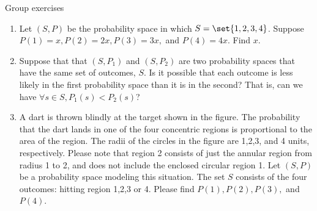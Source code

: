 \documentclass[10pt]{beamer}
\begin{document}
\begin{frame}{Group exercises}
\small 
\begin{minipage}{.83\textwidth}
\begin{enumerate}
	\item Let $(S,P)$ be the probability space in which $S=\set{1,2,3,4}$. Suppose $P(1) =x, P(2) = 2x, P(3) = 3x,$ and  $P(4)=4x$.  Find $x$.
	\item Suppose that that $(S,P_1)$  and $(S,P_2)$ are two probability spaces that have the same set of outcomes, $S$.   Is it possible that each outcome is less likely in the first probability space than it is in the second?  That is, can we have $\forall s \in S, P_1(s) < P_2(s)$? 
	\item A dart is thrown blindly at the target shown in the figure. The probability that the dart lands in one of the four concentric regions is proportional to the area of the region.  The radii of the circles in the figure are 1,2,3, and 4 units, respectively. Please note that region 2 consists of just the annular region from radius 1 to 2, and does not include the enclosed circular region 1.    Let $(S,P)$ be a probability space modeling this situation.  The set $S$ consists of the four outcomes: hitting region 1,2,3 or 4.  Please find $P(1), P(2), P(3),$ and $P(4)$.  %
\end{enumerate}
\end{minipage} %
\hfill 
\begin{minipage}{.15\textwidth}
\vspace{4cm}
	\begin{center}
    \end{center}
 
\end{minipage}

\end{frame}
\end{document}
